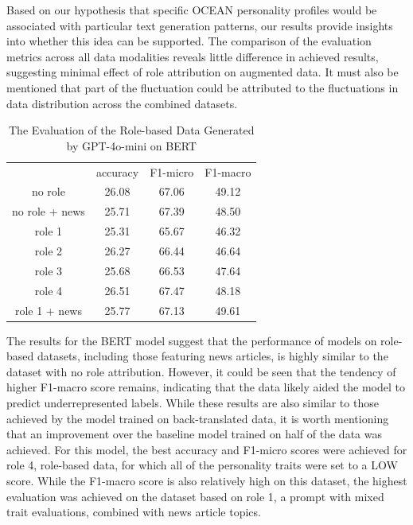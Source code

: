 \documentclass[manuscript]{clv3}
\begin{document}
Based on our hypothesis that specific OCEAN personality profiles would be associated with particular text generation patterns, our results provide insights into whether this idea can be supported. The comparison of the evaluation metrics across all data modalities reveals little difference in achieved results, suggesting minimal effect of role attribution on augmented data. It must also be mentioned that part of the fluctuation could be attributed to the fluctuations in data distribution across the combined datasets.
\begin{table}
    \centering
    \begin{tabular}{cccc}
         &  accuracy&  F1-micro& F1-macro\\
         no role&  26.08&  67.06& 49.12\\
 no role + news& 25.71& 67.39&48.50\\
         role 1&  25.31&  65.67& 46.32\\
         role 2&  26.27&  66.44& 46.64\\
         role 3&  25.68&  66.53& 47.64\\
         role 4&  26.51&  67.47& 48.18\\
         role 1 + news&  25.77&  67.13& 49.61\\
    \end{tabular}
    \caption{The Evaluation of the Role-based Data Generated by GPT-4o-mini on BERT}
    \label{tab:role-based_BERT}
\end{table}

The results for the BERT model suggest that the performance of models on role-based datasets, including those featuring news articles, is highly similar to the dataset with no role attribution. However, it could be seen that the tendency of higher F1-macro score remains, indicating that the data likely aided the model to predict underrepresented labels. While these results are also similar to those achieved by the model trained on back-translated data, it is worth mentioning that an improvement over the baseline model trained on half of the data was achieved. For this model, the best accuracy and F1-micro scores were achieved for role 4, role-based data, for which all of the personality traits were set to a LOW score. While the F1-macro score is also relatively high on this dataset, the highest evaluation was achieved on the dataset based on role 1, a prompt with mixed trait evaluations, combined with news article topics.
\end{document}
